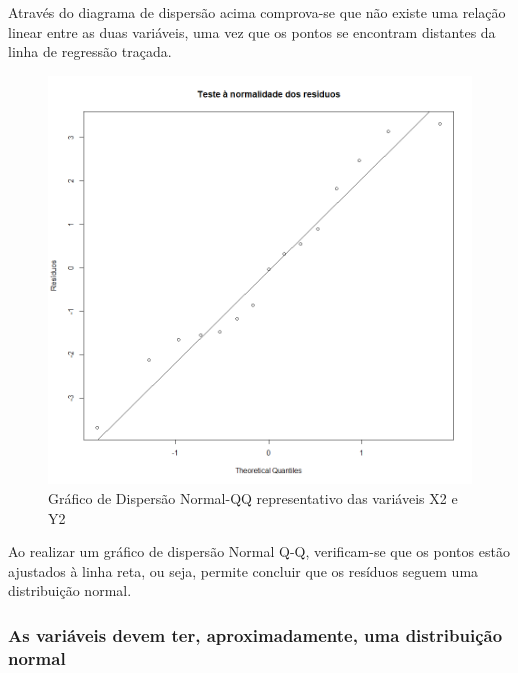 \documentclass[conference]{IEEEtran}
\begin{document}
Através do diagrama de dispersão acima comprova-se que não existe uma relação linear entre as duas variáveis, uma vez que os pontos se encontram distantes da linha de regressão traçada.

\begin{figure}[htbp]
\centerline{\includegraphics[width=0.95\columnwidth]{images/03.b.3.png}}
\caption{Gráfico de Dispersão Normal-QQ representativo das variáveis X2 e Y2}
\label{fig}
\end{figure}

Ao realizar um gráfico de dispersão Normal Q-Q, verificam-se que os pontos estão ajustados à linha reta, ou seja, permite concluir que os resíduos seguem uma distribuição normal.

\subsubsection{As variáveis devem ter, aproximadamente, uma distribuição normal}
\end{document}
